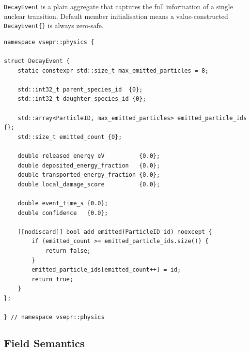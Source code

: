 \documentclass[11pt,a4paper]{article}
\begin{document}
\texttt{DecayEvent} is a plain aggregate that captures the full
information of a single nuclear transition.  Default member
initialisation means a value-constructed \texttt{DecayEvent\{\}} is
always zero-safe.

\begin{lstlisting}[style=cpp20, caption={\texttt{include/physics/decay\_event.hpp}}]
namespace vsepr::physics {

struct DecayEvent {
    static constexpr std::size_t max_emitted_particles = 8;

    std::int32_t parent_species_id  {0};
    std::int32_t daughter_species_id {0};

    std::array<ParticleID, max_emitted_particles> emitted_particle_ids {};
    std::size_t emitted_count {0};

    double released_energy_eV          {0.0};
    double deposited_energy_fraction   {0.0};
    double transported_energy_fraction {0.0};
    double local_damage_score          {0.0};

    double event_time_s {0.0};
    double confidence   {0.0};

    [[nodiscard]] bool add_emitted(ParticleID id) noexcept {
        if (emitted_count >= emitted_particle_ids.size()) {
            return false;
        }
        emitted_particle_ids[emitted_count++] = id;
        return true;
    }
};

} // namespace vsepr::physics
\end{lstlisting}

\subsection{Field Semantics}
\end{document}
